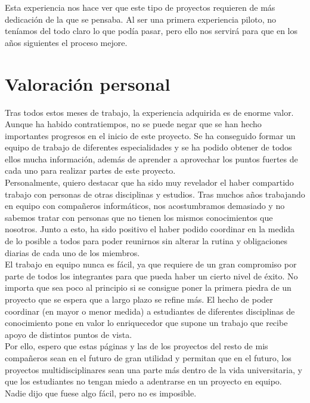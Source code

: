 Esta experiencia nos hace ver que este tipo de proyectos requieren de más dedicación de la que se pensaba. Al ser una primera experiencia piloto, no teníamos del todo claro lo que podía pasar, pero ello nos servirá para que en los años siguientes el proceso mejore.

\section{Valoración personal}
Tras todos estos meses de trabajo, la experiencia adquirida es de enorme valor. Aunque ha habido contratiempos, no se puede negar que se han hecho importantes progresos en el inicio de este proyecto. Se ha conseguido formar un equipo de trabajo de diferentes especialidades y se ha podido obtener de todos ellos mucha información, además de aprender a aprovechar los puntos fuertes de cada uno para realizar partes de este proyecto.\\

Personalmente, quiero destacar que ha sido muy revelador el haber compartido trabajo con personas de otras disciplinas y estudios. Tras muchos años trabajando en equipo con compañeros informáticos, nos acostumbramos demasiado y no sabemos tratar con personas que no tienen los mismos conocimientos que nosotros. Junto a esto, ha sido positivo el haber podido coordinar en la medida de lo posible a todos para poder reunirnos sin alterar la rutina y obligaciones diarias de cada uno de los miembros.\\

El trabajo en equipo nunca es fácil, ya que requiere de un gran compromiso por parte de todos los integrantes para que pueda haber un cierto nivel de éxito. No importa que sea poco al principio si se consigue poner la primera piedra de un proyecto que se espera que a largo plazo se refine más. El hecho de poder coordinar (en mayor o menor medida) a estudiantes de diferentes disciplinas de conocimiento pone en valor lo enriquecedor que supone un trabajo que recibe apoyo de distintos puntos de vista.\\

Por ello, espero que estas páginas y las de los proyectos del resto de mis compañeros sean en el futuro de gran utilidad y permitan que en el futuro, los proyectos multidisciplinares sean una parte más dentro de la vida universitaria, y que los estudiantes no tengan miedo a adentrarse en un proyecto en equipo. Nadie dijo que fuese algo fácil, pero no es imposible.\\

